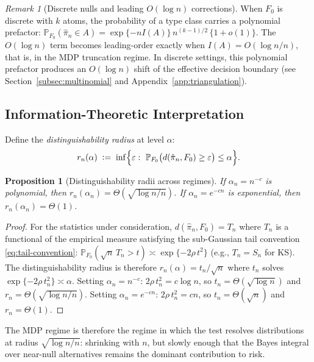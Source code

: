 \documentclass[11pt]{article}
\newcommand{\defeq}{\mathrel{\mathop:}=}
\newcommand{\rhotail}{\rho}  %
\newcommand{\1}{\mathbf{1}}
\newcommand{\PP}{\mathbb{P}}
\theoremstyle{plain}
\newtheorem{proposition}[theorem]{Proposition}
\theoremstyle{definition}
\theoremstyle{remark}
\newtheorem{remark}[theorem]{Remark}
\begin{document}
\begin{remark}[Discrete nulls and leading $O(\log n)$ corrections]\label{rem:discrete-correction}
When $F_0$ is discrete with $k$ atoms, the probability of a type class carries a polynomial prefactor:
$\PP_{F_0}(\hat{\pi}_n\in A) = \exp\{-n I(A)\}\,n^{(k-1)/2}\,\{1+o(1)\}$.
The $O(\log n)$ term becomes leading-order exactly when $I(A)=O(\log n/n)$, that is, in the MDP truncation regime.
In discrete settings, this polynomial prefactor produces an $O(\log n)$ shift of the effective decision boundary (see Section~\ref{subsec:multinomial} and Appendix~\ref{app:triangulation}).
\end{remark}


\subsection{Information-Theoretic Interpretation}

Define the \emph{distinguishability radius} at level $\alpha$:
\begin{equation}\label{eq:distinguishability-radius}
r_n(\alpha)
\;\defeq\;
\inf\Bigl\{\varepsilon:\ \PP_{F_0}\bigl(d(\hat{\pi}_n,F_0)\ge \varepsilon\bigr)\le \alpha\Bigr\}.
\end{equation}

\begin{proposition}[Distinguishability radii across regimes]\label{prop:dist-radius}
If $\alpha_n=n^{-c}$ is polynomial, then $r_n(\alpha_n)=\Theta(\sqrt{\log n/n})$.
If $\alpha_n=e^{-cn}$ is exponential, then $r_n(\alpha_n)=\Theta(1)$.
\end{proposition}

\begin{proof}
For the statistics under consideration, $d(\hat{\pi}_n, F_0) = T_n$ where $T_n$ is a functional of the empirical measure satisfying the sub-Gaussian tail convention \eqref{eq:tail-convention}: $\PP_{F_0}(\sqrt{n}\,T_n > t) \asymp \exp\{-2\rhotail\,t^2\}$ (e.g., $T_n = S_n$ for KS).
The distinguishability radius is therefore $r_n(\alpha) = t_n/\sqrt{n}$ where $t_n$ solves $\exp\{-2\rhotail\,t_n^2\}\asymp\alpha$.
Setting $\alpha_n = n^{-c}$: $2\rhotail\,t_n^2 = c\log n$, so $t_n = \Theta(\sqrt{\log n})$ and $r_n = \Theta(\sqrt{\log n/n})$.
Setting $\alpha_n = e^{-cn}$: $2\rhotail\,t_n^2 = cn$, so $t_n = \Theta(\sqrt{n})$ and $r_n = \Theta(1)$.
\end{proof}

The MDP regime is therefore the regime in which the test resolves distributions at radius $\sqrt{\log n/n}$: shrinking with $n$, but slowly enough that the Bayes integral over near-null alternatives remains the dominant contribution to risk.
\end{document}
